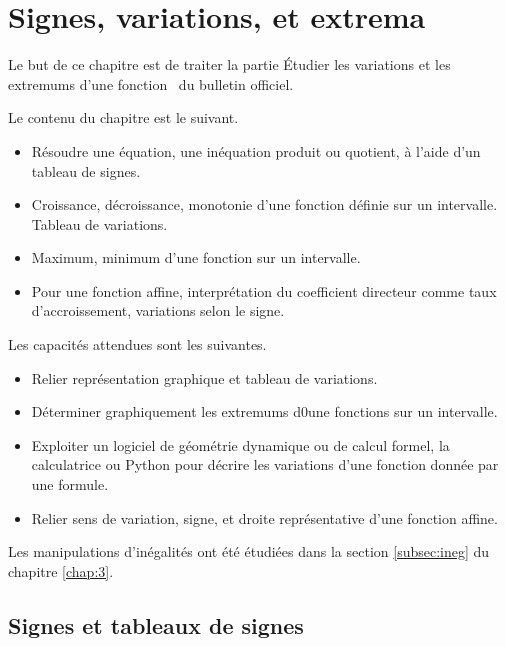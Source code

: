 
\chapter{Signes, variations, et extrema}

Le but de ce chapitre est de traiter la partie \og Étudier les variations et les extremums d'une fonction \fg~du bulletin officiel.

Le contenu du chapitre est le suivant.
	\begin{itemize}
		\item Résoudre une équation, une inéquation produit ou quotient, à l'aide d'un tableau de signes.
		\item Croissance, décroissance, monotonie d'une fonction définie sur un intervalle. Tableau de variations.
		\item Maximum, minimum d'une fonction sur un intervalle.
		\item Pour une fonction affine, interprétation du coefficient directeur comme taux d'accroissement, variations selon le signe.
	\end{itemize}

Les capacités attendues sont les suivantes.
	\begin{itemize}
		\item Relier représentation graphique et tableau de variations.
		\item Déterminer graphiquement les extremums d0une fonctions sur un intervalle.
		\item Exploiter un logiciel de géométrie dynamique ou de calcul formel, la calculatrice ou Python pour décrire les variations d'une fonction donnée par une formule.
		\item Relier sens de variation, signe, et droite représentative d'une fonction affine.
	\end{itemize}
	

Les manipulations d'inégalités ont été étudiées dans la section \ref{subsec:ineg} du chapitre \ref{chap:3}.

\section{Signes et tableaux de signes}


